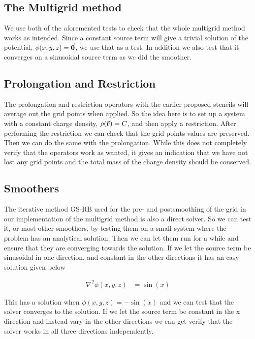 \subsection{The Multigrid method}
	We use both of the aforemented tests to check that the whole multigrid method
	works as intended. Since a constant source term will give a trivial solution of
	the potential, \(\phi(x,y,z) = \va{0}\), we use that as a test. In addition we
	also test that it converges on a sinusoidal source term as we did the smoother.

\subsection{Prolongation and Restriction}


	The prolongation and restriction operators with the earlier proposed stencils
 	will average out the grid points when applied. So the idea here is to set up a
 	system with a constant charge density, \(\rho(\va{r}) = C\), and then apply a
	restriction. After performing the restriction we can check that the grid points
	values are preserved. Then we can do the same with the prolongation. While this
	does not completely verify that the operators work as wanted, it gives an indication
	that we have not lost any grid points and the total mass of the charge density should be conserved.

\subsection{Smoothers}

	The iterative method GS-RB used for the pre- and postsmoothing of the grid in
	our implementation of the multigrid method is also a direct solver.
	So we can test it, or most other smoothers, by testing them on a small system
	where the problem has an analytical solution. Then we can let them run for a
	while and ensure that they are converging towards the solution. If we let
	the source term be sinusoidal in one direction, and constant in the other
	directions it has an easy solution given below

	\begin{align}
		\nabla^2 \phi(x,y,z) &= \sin(x)
	\end{align}

	This has a solution when \(\phi(x,y,z) = -\sin(x)\) and we can test that the
	solver converges to the solution. If we let the source term be constant in the
	x direction and instead vary in the other directions we can get verify that the
	solver works in all three directions independently.

